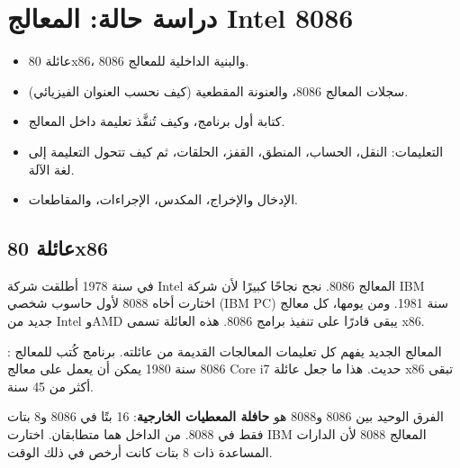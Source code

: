 \chapter{دراسة حالة: المعالج \textenglish{Intel 8086}}

\begin{khulasa}
\begin{itemize}
    \item عائلة \textenglish{80x86}، والبنية الداخلية للمعالج \textenglish{8086}.
    \item سجلات المعالج \textenglish{8086}، والعنونة المقطعية (كيف نحسب العنوان الفيزيائي).
    \item كتابة أول برنامج، وكيف تُنفَّذ تعليمة داخل المعالج.
    \item التعليمات: النقل، الحساب، المنطق، القفز، الحلقات، ثم كيف تتحول التعليمة إلى لغة الآلة.
    \item الإدخال والإخراج، المكدس، الإجراءات، والمقاطعات.
\end{itemize}
\end{khulasa}

\section{عائلة \textenglish{80x86}}

في سنة 1978 أطلقت شركة \textenglish{Intel} المعالج \textenglish{8086}. نجح نجاحًا كبيرًا لأن شركة
\textenglish{IBM} اختارت أخاه \textenglish{8088} لأول حاسوب شخصي \textenglish{(IBM PC)} سنة 1981. ومن
يومها، كل معالج جديد من \textenglish{Intel} و\textenglish{AMD} يبقى قادرًا على تنفيذ برامج \textenglish{8086}.
هذه العائلة تسمى \textenglish{x86}.

\begin{tarif}
    : المعالج الجديد يفهم
    كل تعليمات المعالجات القديمة من عائلته. برنامج كُتب للمعالج \textenglish{8086} سنة 1980 يمكن أن يعمل
    على معالج \textenglish{Core i7} حديث. هذا ما جعل عائلة \textenglish{x86} تبقى أكثر من 45 سنة.
\end{tarif}

\begin{hal}
    الفرق الوحيد بين \textenglish{8086} و\textenglish{8088} هو \textbf{حافلة المعطيات الخارجية}: 16 بتًا في \textenglish{8086}
    و8 بتات فقط في \textenglish{8088}. من الداخل هما متطابقان. اختارت \textenglish{IBM} المعالج \textenglish{8088} لأن
    الدارات المساعدة ذات 8 بتات كانت أرخص في ذلك الوقت.
\end{hal}

